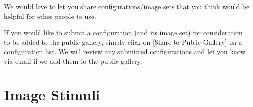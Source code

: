 \documentclass{article}
\begin{document}
We would love to let you share configurations/image sets that you think would be helpful for other people to use.

If you would like to submit a configuration (and its image set) for
consideration to be added to the public gallery, simply click on [Share
to Public Gallery] on a configuration list.
We will review any submitted configurations and let you know via email
if we add them to the public gallery.


\section{Image Stimuli}
\label{sec-images}

\begin{figure}
\begin{center}

\end{center}
\end{figure}
\end{document}
